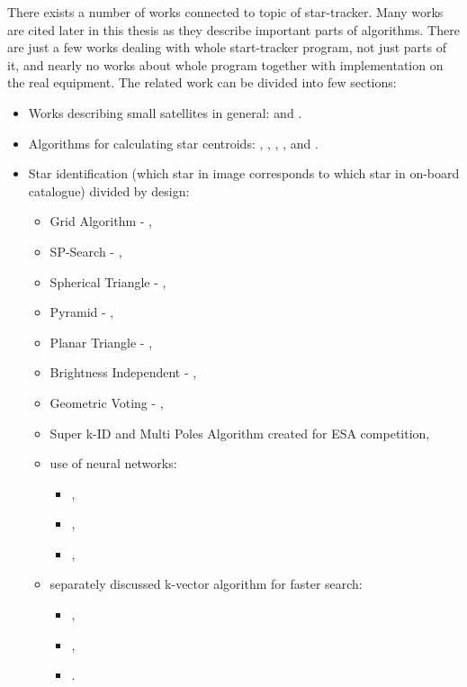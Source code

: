 \documentclass[12pt,a4paper,twoside]{article}
\begin{document}
There exists a number of works connected to topic of star-tracker. Many works are cited later in this thesis as they describe important parts of algorithms. There are just a few works dealing with whole start-tracker program, not just parts of it, and nearly no works about whole program together with implementation on the real equipment. The related work can be divided into few sections:

\begin{itemize}[noitemsep]
\item Works describing small satellites in general: \citet{heidt2000cubesat} and \citet{swartwout2011brief}.

\item Algorithms for calculating star centroids: \citet{liebe2002accuracy}, \citet{samaan2002predictive}, \citet{knutson2012fast}, \citet{azizabadi2014vlsi}, \citet{lindh2014development} and \citet{zhang2014brightness}. 

\item Star identification (which star in image corresponds to which star in on-board catalogue) divided by design:
\begin{itemize}[noitemsep]
\item Grid Algorithm - \citet{padgett1997grid}, 
\item SP-Search - \citet{mortari1999sp},
\item Spherical Triangle - \citet{cole2004fast}, 
\item Pyramid - \citet{mortari2004pyramid}, 
\item Planar Triangle - \citet{cole2006fast}, 
\item Brightness Independent - \citet{dong2006brightness},
\item Geometric Voting - \citet{kolomenkin2008geometric}, 
\item Super k-ID and Multi Poles Algorithm created for ESA competition\cite{esa-competition},
\item use of neural networks: 
\begin{itemize}[noitemsep]
\item \citet{lindbladstar},
\item \citet{li2003star}, 
\item \citet{miri2012star}, 
\end{itemize}
\item separately discussed k-vector algorithm for faster search:
\begin{itemize}[noitemsep]
\item \citet{mortari1996fast}, 
\item \citet{mortari2000k},
\item \citet{mortari2013k}. 
\end{itemize}
\end{itemize}


\end{itemize}
\end{document}
